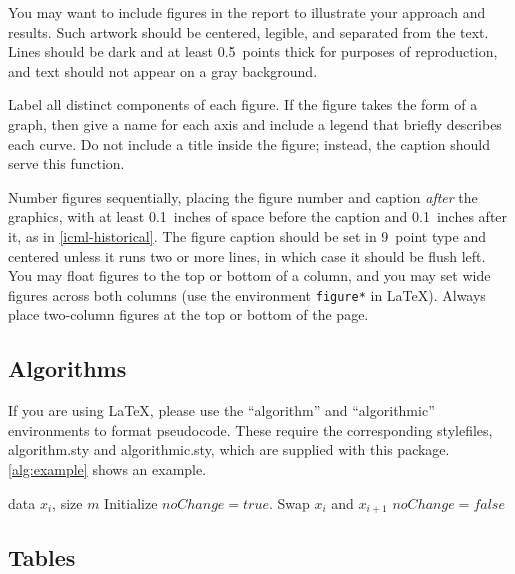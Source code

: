 \documentclass{article}
\theoremstyle{plain}
\theoremstyle{definition}
\theoremstyle{remark}
\begin{document}
You may want to include figures in the report to illustrate your approach and
results. Such artwork should be centered, legible, and separated from the text.
Lines should be dark and at least 0.5~points thick for purposes of
reproduction, and text should not appear on a gray background.

Label all distinct components of each figure. If the figure takes the form of a
graph, then give a name for each axis and include a legend that briefly
describes each curve. Do not include a title inside the figure; instead, the
caption should serve this function.

Number figures sequentially, placing the figure number and caption \emph{after}
the graphics, with at least 0.1~inches of space before the caption and
0.1~inches after it, as in \cref{icml-historical}. The figure caption should be
set in 9~point type and centered unless it runs two or more lines, in which
case it should be flush left. You may float figures to the top or bottom of a
column, and you may set wide figures across both columns (use the environment
\texttt{figure*} in \LaTeX). Always place two-column figures at the top or
bottom of the page.

\subsection{Algorithms}

If you are using \LaTeX, please use the ``algorithm'' and ``algorithmic''
environments to format pseudocode. These require the corresponding stylefiles,
algorithm.sty and algorithmic.sty, which are supplied with this package.
\cref{alg:example} shows an example.

\begin{algorithm}[tb]
  \caption{Bubble Sort}
  \label{alg:example}
  \begin{algorithmic}
     data $x_i$, size $m$
    \REPEAT
    \STATE Initialize $noChange = true$.
    \STATE Swap $x_i$ and $x_{i+1}$
    \STATE $noChange = false$
    \ENDIF
    \ENDFOR
  \end{algorithmic}
\end{algorithm}


\subsection{Tables}
\end{document}
